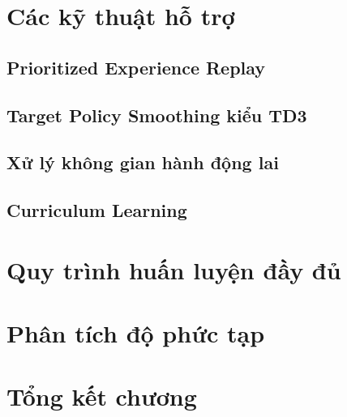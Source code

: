 \section{Các kỹ thuật hỗ trợ}
\label{sec:alg:supporting}

\subsection{Prioritized Experience Replay}
\label{subsec:alg:per}

\subsection{Target Policy Smoothing kiểu TD3}
\label{subsec:alg:td3}

\subsection{Xử lý không gian hành động lai}
\label{subsec:alg:hybrid}

\subsection{Curriculum Learning}
\label{subsec:alg:curriculum}

\section{Quy trình huấn luyện đầy đủ}
\label{sec:alg:training}

\section{Phân tích độ phức tạp}
\label{sec:alg:complexity}

\section{Tổng kết chương}
\label{sec:alg:summary}

